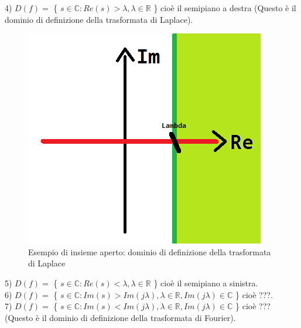 \pagebreak

4) $ D(f) = $ \{ $ s \in \mathbb{C} : Re(s)> \lambda, \lambda \in \mathbb{R} $ \} cioè il semipiano a destra (Questo è il dominio di definizione della trasformata di Laplace). \\

\begin{figure}[h]
	\centering
	\includegraphics[scale=0.75]{immagini/dominioDefLaplace}
	\caption{ Esempio di insieme aperto: dominio di definizione della trasformata di Laplace }
	\label{fig: dominioDefLaplace}
\end{figure}

5) $D(f) = $ \{ $ s \in \mathbb{C} : Re(s)< \lambda, \lambda \in \mathbb{R} $ \} cioè il semipiano a sinistra. \\ 
6) $D(f) = $ \{ $ s \in \mathbb{C} : Im(s) > Im(j\lambda ), \lambda \in \mathbb{R}, Im(j\lambda ) \in \mathbb{C} $ \} cioè ???. \\
7) $D(f) = $ \{ $ s \in \mathbb{C} : Im(s) < Im(j\lambda ), \lambda \in \mathbb{R}, Im(j\lambda ) \in \mathbb{C} $ \} cioè ??? (Questo è il dominio di definizione della trasformata di Fourier).\\

